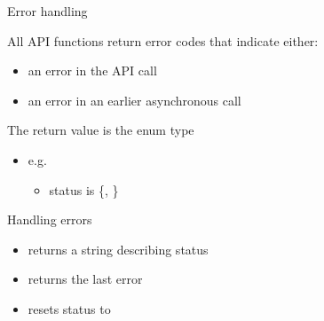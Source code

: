 \begin{frame}[fragile]{Error handling}

    \begin{info}{}
        All API functions return error codes that indicate either:
        \begin{itemize}
            \item an error in the API call
            \item an error in an earlier asynchronous call
        \end{itemize}
        The return value is the enum type 
        \begin{itemize}
            \item e.g. 
            \begin{itemize}
                \item status is \{, \}
            \end{itemize}
        \end{itemize}
    \end{info}

    \begin{info}{Handling errors}
        \centering {}
        \begin{itemize}
            \item returns a string describing status
        \end{itemize}
        \centering {}
        \begin{itemize}
            \item returns the last error
            \item resets status to 
        \end{itemize}
    \end{info}

\end{frame}

